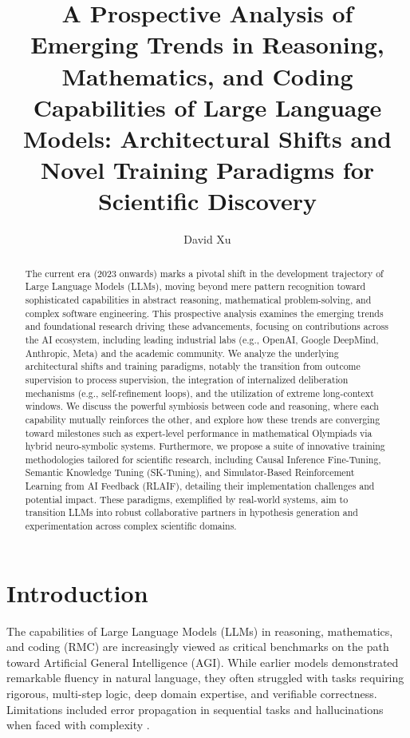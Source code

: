 \documentclass{article}
\title{A Prospective Analysis of Emerging Trends in Reasoning, Mathematics, and Coding Capabilities of Large Language Models: Architectural Shifts and Novel Training Paradigms for Scientific Discovery}
\author{David Xu}
\date{}
\begin{document}
\maketitle

\begin{abstract}
The current era (2023 onwards) marks a pivotal shift in the development trajectory of Large Language Models (LLMs), moving beyond mere pattern recognition toward sophisticated capabilities in abstract reasoning, mathematical problem-solving, and complex software engineering. This prospective analysis examines the emerging trends and foundational research driving these advancements, focusing on contributions across the AI ecosystem, including leading industrial labs (e.g., OpenAI, Google DeepMind, Anthropic, Meta) and the academic community. We analyze the underlying architectural shifts and training paradigms, notably the transition from outcome supervision to process supervision, the integration of internalized deliberation mechanisms (e.g., self-refinement loops), and the utilization of extreme long-context windows. We discuss the powerful symbiosis between code and reasoning, where each capability mutually reinforces the other, and explore how these trends are converging toward milestones such as expert-level performance in mathematical Olympiads via hybrid neuro-symbolic systems. Furthermore, we propose a suite of innovative training methodologies tailored for scientific research, including Causal Inference Fine-Tuning, Semantic Knowledge Tuning (SK-Tuning), and Simulator-Based Reinforcement Learning from AI Feedback (RLAIF), detailing their implementation challenges and potential impact. These paradigms, exemplified by real-world systems, aim to transition LLMs into robust collaborative partners in hypothesis generation and experimentation across complex scientific domains.
\end{abstract}

\section{Introduction}
The capabilities of Large Language Models (LLMs) in reasoning, mathematics, and coding (RMC) are increasingly viewed as critical benchmarks on the path toward Artificial General Intelligence (AGI). While earlier models demonstrated remarkable fluency in natural language, they often struggled with tasks requiring rigorous, multi-step logic, deep domain expertise, and verifiable correctness. Limitations included error propagation in sequential tasks and hallucinations when faced with complexity \cite{bubeck2023sparks, jiang2024mixtral}.
\end{document}
